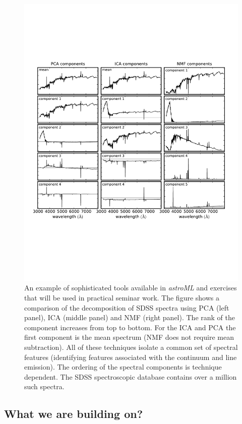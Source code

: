 \begin{figure}[!t]
\vskip -1.8in
\includegraphics[width=1.02\hsize,clip]{astroML2.pdf}
\vskip -2.0in
\caption{An example of sophisticated tools available in {\it astroML} and exercises that will be
used in practical seminar work. The figure shows a comparison of the decomposition of SDSS 
spectra using PCA (left panel), ICA (middle panel) and NMF (right panel). The rank of the component
increases from top to bottom. For the ICA and PCA the first component is the mean spectrum (NMF 
does not require mean subtraction). All of these techniques isolate a common set of spectral features 
(identifying features associated with the continuum and line emission). The ordering of the spectral 
components is technique dependent. The SDSS spectroscopic database contains over a million
such spectra.} 
\label{Fig:astroML2}
\end{figure}


\subsection{What we are building on?}
\label{sec:precursors}

